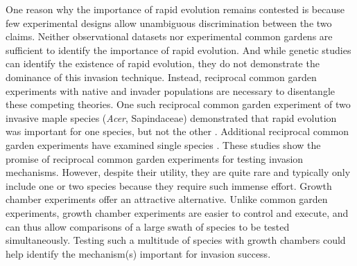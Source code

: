 \documentclass[12pt]{article}\usepackage[]{graphicx}\usepackage[]{color}
\begin{document}
	One reason why the importance of rapid evolution remains contested is because few experimental designs allow unambiguous discrimination between the two claims. Neither observational datasets \parencite[e.g.,][]{Wolkovich2013} nor experimental common gardens \parencite{Conner2004,Vitasse2009} are sufficient to identify the importance of rapid evolution. And while genetic studies can identify the existence of rapid evolution, they do not demonstrate the dominance of this invasion technique. Instead, reciprocal common garden experiments with native and invader populations are necessary to disentangle these competing theories. One such reciprocal common garden experiment of two invasive maple species (\textit{Acer}, Sapindaceae) demonstrated that rapid evolution was important for one species, but not the other \parencite{Lamarque2015}. Additional reciprocal common garden experiments have examined single species \parencite[e.g.,][]{Williams2008}. These studies show the promise of reciprocal common garden experiments for testing invasion mechanisms. However, despite their utility, they are quite rare and typically only include one or two species because they require such immense effort. Growth chamber experiments offer an attractive alternative. Unlike common garden experiments, growth chamber experiments are easier to control and execute, and can thus allow comparisons of a large swath of species to be tested simultaneously. Testing such a multitude of species with growth chambers could help identify the mechanism(s) important for invasion success.  %
	
	
\end{document}
